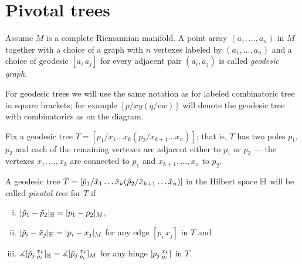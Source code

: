 \pagebreak %
\section{Pivotal trees}\label{sec:pivotal} 

\begin{wrapfigure}{r}{27 mm}
\vskip-0mm
\end{wrapfigure}

Assume $M$ is a complete Riemannian manifold.
A point array $(a_1,\dots,a_n)$ in $M$ together with a choice of a graph with $n$ vertexes labeled by  $(a_1,\dots,a_n)$ and a choice of geodesic $[a_i\,a_j]$ for every adjacent pair $(a_i,a_j)$ is called \emph{geodesic graph}.

For geodesic trees we will use the same notation as for labeled combinatoric tree in square brackets;
for example $[p/xy(q/vw)]$ will denote the geodesic tree with combinatorics as on the diagram.

Fix a geodesic tree $T=[p_1/x_1\dots x_k(p_2/x_{k+1}\dots x_n)]$;
that is, $T$ has two poles $p_1$, $p_2$ and each of the remaining vertexes are adjacent either to $p_1$ or $p_2$ --- the vertexes $x_1,\dots, x_k$ are connected to $p_1$ and $x_{k+1},\dots, x_n$ to $p_2$.

A geodesic tree  $\~T=[\~p_1/\~x_1\dots \~x_k(\~p_2/\~x_{k+1}\dots \~x_n)]$ in the Hilbert space $\HH$ will be called \emph{pivotal tree} for $T$
if 
\begin{enumerate}[(i)]
\item $|\~p_1-\~p_2|_\HH= |p_1-p_2|_M$,
\item $|\~p_i-\~x_j|_\HH= |p_i-x_j|_M$ for any edge $[p_i\,x_j]$ in $T$ and
\item $\measuredangle[\~p_j\,^{\~x_k}_{\~p_i}]_{\HH}=\measuredangle[\~p_j\,^{\~x_k}_{\~p_i}]_M$
for any hinge  $[p_j\,^{x_k}_{\~p_i}]$ in $T$.
\end{enumerate}


